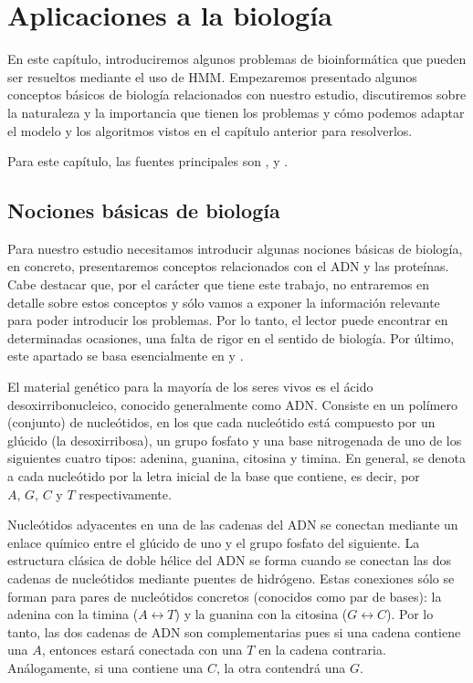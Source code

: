 \chapter{Aplicaciones a la biología}

En este capítulo, introduciremos algunos problemas de bioinformática que pueden ser resueltos mediante el uso de HMM. Empezaremos presentado algunos conceptos básicos de biología relacionados con nuestro estudio, discutiremos sobre la naturaleza y la importancia que tienen los problemas y cómo podemos adaptar el modelo y los algoritmos vistos en el capítulo anterior para resolverlos.

Para este capítulo, las fuentes principales son \cite{Durbin}, \cite{Yoon} y \cite[Capítulo 8]{Vidyasagar}.

\section{Nociones básicas de biología}
Para nuestro estudio necesitamos introducir algunas nociones básicas de biología, en concreto, presentaremos conceptos relacionados con el ADN y las proteínas. Cabe destacar que, por el carácter que tiene este trabajo, no entraremos en detalle sobre estos conceptos y sólo vamos a exponer la información relevante para poder introducir los problemas. Por lo tanto, el lector puede encontrar en determinadas ocasiones, una falta de rigor en el sentido de biología. Por último, este apartado se basa esencialmente en \cite[Capítulo 8]{Vidyasagar} y \cite[Apéndice A]{Warren}.

El material genético para la mayoría de los seres vivos es el ácido desoxirribonucleico, conocido generalmente como ADN. Consiste en un polímero (conjunto) de nucleótidos, en los que cada nucleótido está compuesto por un glúcido (la desoxirribosa), un grupo fosfato y una base nitrogenada de uno de los siguientes cuatro tipos: adenina, guanina, citosina y timina. En general, se denota a cada nucleótido por la letra inicial de la base que contiene, es decir, por $A,\, G,\, C$ y $T$ respectivamente. 

Nucleótidos adyacentes en una de las cadenas del ADN se conectan mediante un enlace químico entre el glúcido de uno y el grupo fosfato del siguiente. La estructura clásica de doble hélice del ADN se forma cuando se conectan las dos cadenas de nucleótidos mediante puentes de hidrógeno. Estas conexiones sólo se forman para pares de nucleótidos concretos (conocidos como par de bases): la adenina con la timina ($A\leftrightarrow T$) y la guanina con la citosina ($G\leftrightarrow C$). Por lo tanto, las dos cadenas de ADN son complementarias pues si una cadena contiene una $A$, entonces estará conectada con una $T$ en la cadena contraria. Análogamente, si una contiene una $C$, la otra contendrá una $G$. 

